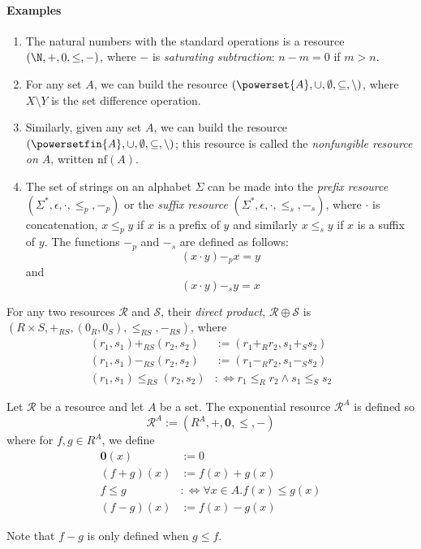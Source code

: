 \documentclass[10pt]{article}
\begin{document}
\paragraph{Examples}

\begin{enumerate}
    \item The natural numbers with the standard operations is a resource $(\N, +, 0, \leq, -)$, where $-$ is \emph{saturating subtraction}: $n - m = 0$ if $m > n$.
    \item For any set $A$, we can build the resource $(\powerset{A}, \cup, \emptyset, \subseteq, \setminus)$, where $X \setminus Y$ is the set difference operation.
    \item Similarly, given any set $A$, we can build the resource $(\powersetfin{A}, \cup, \emptyset, \subseteq, \setminus)$; this resource is called the \emph{nonfungible resource on $A$}, written $\text{nf}(A)$.
    \item {}
        The set of strings on an alphabet $\Sigma$ can be made into the \emph{prefix resource} $(\Sigma^*, \epsilon, \cdot, \leq_p, -_p)$ or the \emph{suffix resource} $(\Sigma^*, \epsilon, \cdot, \leq_s, -_s)$, where $\cdot$ is concatenation, $x \leq_p y$ if $x$ is a prefix of $y$ and similarly $x \leq_s y$ if $x$ is a suffix of $y$.
        The functions $-_p$ and $-_s$ are defined as follows:
        \[
            (x \cdot y) -_p x = y
        \]
        and
        \[
            (x \cdot y) -_s y = x
        \]
\end{enumerate}

\begin{definition}
    For any two resources $\mathcal{R}$ and $\mathcal{S}$, their \emph{direct product}, $\mathcal{R} \oplus \mathcal{S}$ is $(R \times S, +_{RS}, (0_R, 0_S), \leq_{RS}, -_{RS})$, where
    \begin{align*}
        (r_1, s_1) +_{RS} (r_2, s_2) &:= (r_1 +_R r_2, s_1 +_S s_2) \\
        (r_1, s_1) -_{RS} (r_2, s_2) &:= (r_1 -_R r_2, s_1 -_S s_2) \\
        (r_1, s_1) \leq_{RS} (r_2, s_2) &:\iff r_1 \leq_R r_2 \land s_1 \leq_S s_2
    \end{align*}
\end{definition}

\begin{definition}
    Let $\mathcal{R}$ be a resource and let $A$ be a set.
    The exponential resource $\mathcal{R}^A$  is defined so
    \[
        \mathcal{R}^A := (R^A, +, \bm{0}, \leq, -)
    \]
    where for $f,g \in R^A$, we define
    \begin{align*}
        \bm{0}(x) &:= 0 \\
        (f + g)(x) &:= f(x) + g(x) \\
        f \leq g &:\Leftrightarrow \forall x \in A. f(x) \leq g(x) \\
        (f - g)(x) &:= f(x) - g(x)
    \end{align*}

    Note that $f - g$ is only defined when $g \leq f$.
\end{definition}
\end{document}
